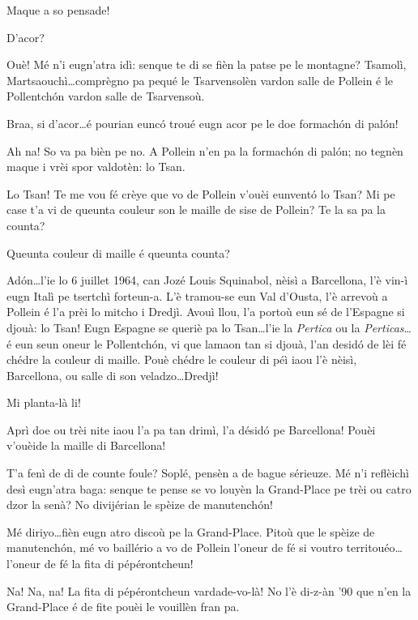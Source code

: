 \begin{drama}
\Taniaspeaks Maque a so pensade!

\Laurentspeaks D'acor?

\Taniaspeaks Ouè! Mé n'i eugn'atra idì: senque te di se fièn la patse pe le montagne? Tsamolì, Martsaouchì\ldots comprègno pa pequé le Tsarvensolèn vardon salle de Pollein é le Pollentch\'on vardon salle de Tsarvensoù.

\Laurentspeaks Braa, si d'acor\ldots é pourian eunc\'o troué eugn acor pe le doe formach\'on di pal\'on!

\Taniaspeaks Ah na! So va pa bièn pe no. A Pollein n'en pa la formach\'on di pal\'on; no tegnèn maque i vrèi spor valdotèn: lo Tsan.

\Laurentspeaks Lo Tsan! Te me vou fé crèye que vo de Pollein v'ouèi eunvent\'o lo Tsan? Mi pe case t'a vi de queunta couleur son le maille de sise de Pollein? Te la sa pa la counta?

\Taniaspeaks Queunta couleur di maille é queunta counta?

\Laurentspeaks Ad\'on\ldots l'ie lo 6 juillet 1964, can Jozé Louis Squinabol, nèisì a Barcellona, l'è vin-ì eugn Italì pe tsertchì forteun-a. L'è tramou-se eun Val d'Ousta, l'è arrevoù a Pollein é l'a prèi lo mitcho i Dredjì. Avouì llou, l'a portoù eun sé de l'Espagne si djouà: lo Tsan! Eugn Espagne se queriè pa lo Tsan\ldots l'ie la \textit{Pertica} ou la \textit{Perticas}\ldots é eun seun oneur le Pollentch\'on, vi que lamaon tan si djouà, l'an desid\'o de lèi fé chédre la couleur di maille. Pouè chédre le couleur di péì iaou l'è nèisì, Barcellona, ou salle di son veladzo\ldots Dredjì!

\Taniaspeaks Mi planta-là li!

\Laurentspeaks Aprì doe ou trèi nite iaou l'a pa tan drimì, l'a désid\'o pe Barcellona! Pouèi v'ouèide la maille di Barcellona!

\Taniaspeaks{} T'a fenì de di de counte foule? Soplé, pensèn a de bague sérieuze. Mé n'i reflèichì desì eugn'atra baga: senque te pense se vo louyèn la Grand-Place pe trèi ou catro dzor la senà? No divijérian le spèize de manutench\'on!

\Laurentspeaks{} Mé diriyo\ldots fièn eugn atro discoù pe la Grand-Place. Pitoù que le spèize de manutench\'on, mé vo baillério a vo de Pollein l'oneur de fé si voutro territouéo\ldots l'oneur de fé la fita di pépérontcheun!

\Taniaspeaks Na! Na, na! La fita di pépérontcheun vardade-vo-là! No l'è di-z-àn '90 que n'en la Grand-Place é de fite pouèi le vouillèn fran pa.


\end{drama}
